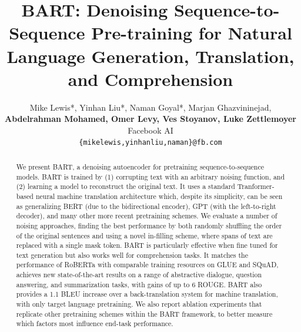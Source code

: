 \documentclass{article} %
\title{BART: Denoising Sequence-to-Sequence Pre-training for Natural Language Generation, Translation, and Comprehension }
\author{Mike Lewis*, Yinhan Liu*, Naman Goyal*,
Marjan Ghazvininejad,\\ \textbf{Abdelrahman Mohamed, Omer Levy, Ves Stoyanov, Luke Zettlemoyer } \\
Facebook AI\\
\texttt{\{mikelewis,yinhanliu,naman\}@fb.com} \\
}
\begin{document}
\maketitle
\begin{abstract}

We present BART, a denoising autoencoder for pretraining sequence-to-sequence models. BART is trained by (1) corrupting text with an arbitrary noising function, and (2) learning a model to reconstruct the original text. It uses a standard Tranformer-based neural machine translation architecture which, despite its simplicity, can be seen as generalizing BERT (due to the bidirectional encoder), GPT (with the left-to-right decoder), and many other more recent pretraining schemes. We evaluate a number of noising approaches, finding the best performance by both randomly shuffling the order of the original sentences and using a novel in-filling scheme, where spans of text are replaced with a single mask token. BART is particularly effective when fine tuned for text generation but also works well for comprehension tasks. It matches the performance of RoBERTa with comparable training resources on GLUE and SQuAD, achieves new state-of-the-art results on a range of abstractive dialogue, question answering, and summarization tasks, with gains of up to 6 ROUGE. BART also provides a 1.1 BLEU increase over a back-translation system for machine translation, with only target language pretraining. We also report ablation experiments that replicate other pretraining schemes within the BART framework, to better measure which factors most influence end-task performance. 


\end{abstract}
\end{document}
